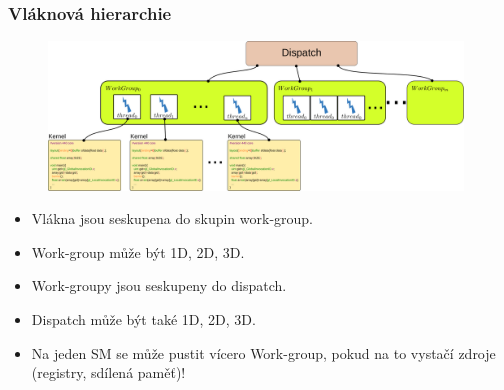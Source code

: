 \begin{frame}
  \frametitle{Vláknová hierarchie}
  \begin{figure}[h]
	\includegraphics[width=11cm,keepaspectratio]{pics/gpu/thread_hierarchy}
	\end{figure}
  \begin{itemize}
    \item Vlákna jsou seskupena do skupin work-group.
    \item Work-group může být 1D, 2D, 3D.
    \item Work-groupy jsou seskupeny do dispatch.
    \item Dispatch může být také 1D, 2D, 3D.
    \item Na jeden SM se může pustit vícero Work-group, pokud na to vystačí zdroje (registry, sdílená paměť)!
  \end{itemize}
\end{frame}


